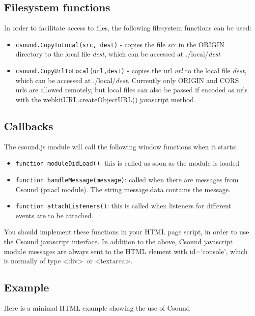 \documentclass[11pt]{article}
\begin{document}
\subsection{Filesystem functions}

In order to facilitate access to files, the following filesystem functions can be used:

\begin{itemize}
\item {\tt csound.CopyToLocal(src, dest)} - copies the file \emph{src} in the ORIGIN directory to the local file \emph{dest}, which can
be accessed at ./local/\emph{dest}
\item {\tt csound.CopyUrlToLocal(url,dest)} - copies the url \emph{url} to the local file \emph{dest}, which can
be accessed at ./local/\emph{dest}. Currently only ORIGIN and CORS urls are allowed remotely, but local files can
also be passed if encoded as urls with the webkitURL.createObjectURL() javascript method.
\end{itemize}


\subsection{Callbacks}

The csound.js module will call the following window functions when it starts:

\begin{itemize} 
\item {\tt function moduleDidLoad()}: this is called as soon as the module is loaded 
\item {\tt function handleMessage(message)}: called when there are messages from Csound (pnacl module). 
The string message.data contains the message.
\item {\tt function attachListeners()}: this is called when listeners for different events are to be attached. 
\end{itemize}

You should implement these functions in your HTML page script, in order to use the Csound javascript interface.
In addition to the above, Csound javascript module messages are always sent to the HTML element with id=`console', 
which is normally of type \textless div\textgreater \, or \textless textarea\textgreater .

\subsection{Example}

Here is a minimal HTML example showing the use of Csound


\end{document}

